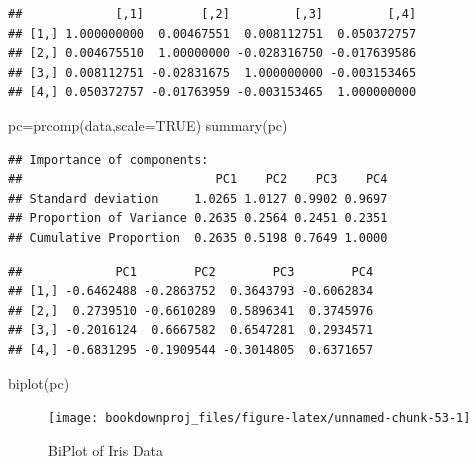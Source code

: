 \documentclass[
]{article}
\newenvironment{Shaded}{\begin{snugshade}}{\end{snugshade}}
\newcommand{\AttributeTok}[1]{\textcolor[rgb]{0.77,0.63,0.00}{#1}}
\newcommand{\ConstantTok}[1]{\textcolor[rgb]{0.00,0.00,0.00}{#1}}
\newcommand{\FunctionTok}[1]{\textcolor[rgb]{0.00,0.00,0.00}{#1}}
\newcommand{\NormalTok}[1]{#1}
\newcommand{\OtherTok}[1]{\textcolor[rgb]{0.56,0.35,0.01}{#1}}
\newcommand{\SpecialCharTok}[1]{\textcolor[rgb]{0.00,0.00,0.00}{#1}}
\theoremstyle{definition}
\theoremstyle{definition}
\theoremstyle{definition}
\theoremstyle{definition}
\theoremstyle{remark}
\begin{document}
\begin{verbatim}
##             [,1]        [,2]         [,3]         [,4]
## [1,] 1.000000000  0.00467551  0.008112751  0.050372757
## [2,] 0.004675510  1.00000000 -0.028316750 -0.017639586
## [3,] 0.008112751 -0.02831675  1.000000000 -0.003153465
## [4,] 0.050372757 -0.01763959 -0.003153465  1.000000000
\end{verbatim}

\begin{Shaded}
\begin{Highlighting}[]
\NormalTok{pc}\OtherTok{=}\FunctionTok{prcomp}\NormalTok{(data,}\AttributeTok{scale=}\ConstantTok{TRUE}\NormalTok{)}
\FunctionTok{summary}\NormalTok{(pc)}
\end{Highlighting}
\end{Shaded}

\begin{verbatim}
## Importance of components:
##                           PC1    PC2    PC3    PC4
## Standard deviation     1.0265 1.0127 0.9902 0.9697
## Proportion of Variance 0.2635 0.2564 0.2451 0.2351
## Cumulative Proportion  0.2635 0.5198 0.7649 1.0000
\end{verbatim}

\begin{Shaded}
\end{Shaded}

\begin{verbatim}
##             PC1        PC2        PC3        PC4
## [1,] -0.6462488 -0.2863752  0.3643793 -0.6062834
## [2,]  0.2739510 -0.6610289  0.5896341  0.3745976
## [3,] -0.2016124  0.6667582  0.6547281  0.2934571
## [4,] -0.6831295 -0.1909544 -0.3014805  0.6371657
\end{verbatim}

\begin{Shaded}
\begin{Highlighting}[]
\FunctionTok{biplot}\NormalTok{(pc)}
\end{Highlighting}
\end{Shaded}

\begin{figure}

{\centering \texttt{[image: bookdownproj\_files/figure-latex/unnamed-chunk-53-1]} 

}

\caption{BiPlot of Iris Data}\label{fig:unnamed-chunk-53}
\end{figure}
\end{document}
